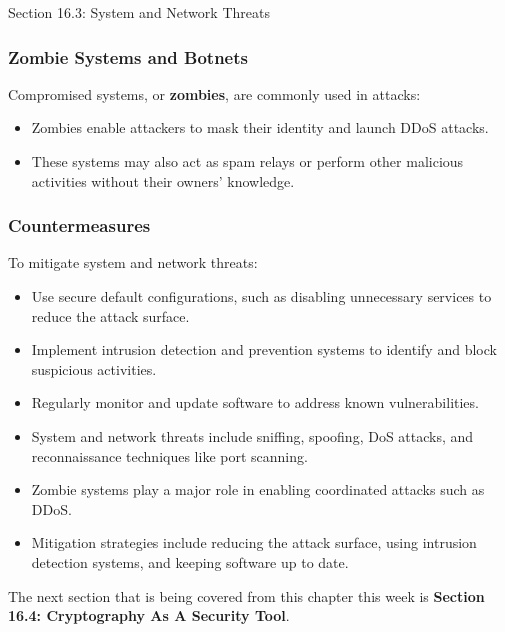 \begin{notes}{Section 16.3: System and Network Threats}
    \subsubsection*{Zombie Systems and Botnets}
    
    Compromised systems, or \textbf{zombies}, are commonly used in attacks:
    \begin{itemize}
        \item Zombies enable attackers to mask their identity and launch DDoS attacks.
        \item These systems may also act as spam relays or perform other malicious activities without their owners' knowledge.
    \end{itemize}
    
    \subsubsection*{Countermeasures}
    
    To mitigate system and network threats:
    \begin{itemize}
        \item Use secure default configurations, such as disabling unnecessary services to reduce the attack surface.
        \item Implement intrusion detection and prevention systems to identify and block suspicious activities.
        \item Regularly monitor and update software to address known vulnerabilities.
    \end{itemize}
    
    \begin{highlight}
        \begin{itemize}
            \item System and network threats include sniffing, spoofing, DoS attacks, and reconnaissance techniques like port scanning.
            \item Zombie systems play a major role in enabling coordinated attacks such as DDoS.
            \item Mitigation strategies include reducing the attack surface, using intrusion detection systems, and keeping software up to date.
        \end{itemize}
    \end{highlight}
\end{notes}

The next section that is being covered from this chapter this week is \textbf{Section 16.4: Cryptography As A Security Tool}.

